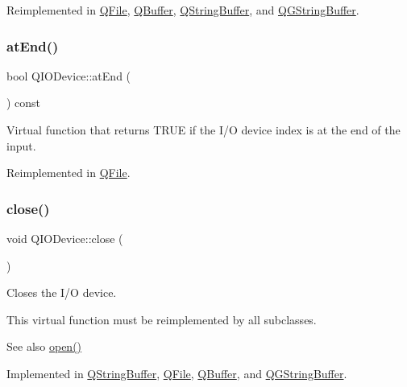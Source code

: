 Reimplemented in \mbox{\hyperlink{class_q_file_aa2f5e380a549e7d3043cf41ac8c57eba}{Q\+File}}, \mbox{\hyperlink{class_q_buffer_a4b4cd4e092b55db973fa34f76403b65d}{Q\+Buffer}}, \mbox{\hyperlink{class_q_string_buffer_a36caaffb3e157196ce5201f0f7c9fa25}{Q\+String\+Buffer}}, and \mbox{\hyperlink{class_q_g_string_buffer_ab1bcf1133571fd71797ad11d5d7f3cb4}{Q\+G\+String\+Buffer}}.

\mbox{\label{class_q_i_o_device_ac5a3fcc9349a98d8f260039c5fd58812}} 
\subsubsection{\texorpdfstring{atEnd()}{atEnd()}}
{\footnotesize\ttfamily bool Q\+I\+O\+Device\+::at\+End (\begin{DoxyParamCaption}{ }\end{DoxyParamCaption}) const\hspace{0.3cm}{\ttfamily [virtual]}}

Virtual function that returns T\+R\+UE if the I/O device index is at the end of the input. 

Reimplemented in \mbox{\hyperlink{class_q_file_a285a896990bd1779c7b3a7066142446b}{Q\+File}}.

\mbox{\label{class_q_i_o_device_a01a9ddac5d964b5b6a1f10005bf28a4f}} 
\subsubsection{\texorpdfstring{close()}{close()}}
{\footnotesize\ttfamily void Q\+I\+O\+Device\+::close (\begin{DoxyParamCaption}{ }\end{DoxyParamCaption})\hspace{0.3cm}{\ttfamily [pure virtual]}}

Closes the I/O device.

This virtual function must be reimplemented by all subclasses.

\begin{DoxySeeAlso}{See also}
\mbox{\hyperlink{class_q_i_o_device_ae4046ae7bf4d4cee1010239973314e42}{open()}} 
\end{DoxySeeAlso}


Implemented in \mbox{\hyperlink{class_q_string_buffer_aabc8736ce1f90cd66212c5a6b2e166ea}{Q\+String\+Buffer}}, \mbox{\hyperlink{class_q_file_ac0d8375a5ea7d4503545d7c68dcf58e1}{Q\+File}}, \mbox{\hyperlink{class_q_buffer_affd0b382476516b0d4e3adfaf27c0247}{Q\+Buffer}}, and \mbox{\hyperlink{class_q_g_string_buffer_a02458102f8968ef46bfaeab319f8e2fc}{Q\+G\+String\+Buffer}}.

